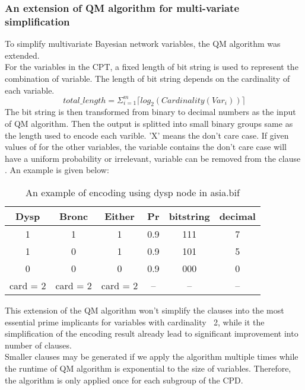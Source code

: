     \subsubsection{An extension of QM algorithm for multi-variate simplification}
    To simplify multi\-variate Bayesian network variables, the QM algorithm was extended.\\
    
    For the variables in the CPT, a fixed length of bit string is used to represent the combination of variable. The length of bit string depends on the cardinality of each variable. 
    $$total\_length = \Sigma_{i = 1}^{m} \lceil log_{2}(Cardinality(Var_{i}))\rceil$$
    The bit string is then transformed from binary to decimal numbers as the input of QM algorithm. Then the output is splitted into small binary groups same as the length used to encode each varible. 'X' means the don't care case. If given values of for the other variables, the variable contains the don't care case will have a uniform probability or irrelevant, variable can be removed from the clause . An example is given below:\\
    
    \begin{table}[]
        \centering
        \begin{tabular}{c c c c |c c}
            \hline
            Dysp & Bronc & Either & Pr & bitstring & decimal \\
            \hline
            \hline
             1 & 1 & 1 & 0.9 & 111 & 7 \\
             1 & 0 & 1 & 0.9 & 101 & 5 \\
             0 & 0 & 0 & 0.9 & 000 & 0 \\
            \hline
            card = 2 & card = 2 & card = 2 & -- & -- & -- \\
            \hline
        \end{tabular}
        \caption{An example of encoding using dysp node in asia.bif}
        \label{tab:my_label}
    \end{table}
    
    This extension of the QM algorithm won't simplify the clauses into the most essential prime implicants for variables with cardinality $\>$ 2, while it the simplification of the encoding result already lead to significant improvement into number of clauses.\\
    
    Smaller clauses may be generated if we apply the algorithm multiple times while the runtime of QM algorithm is exponential to the size of variables. Therefore, the algorithm is only applied once for each subgroup of the CPD.\\
    
